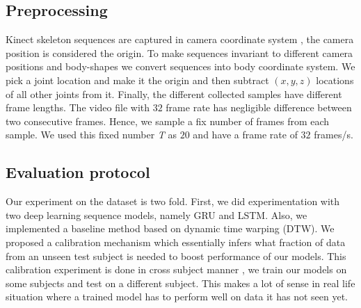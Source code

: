 \documentclass[10pt,twocolumn,letterpaper]{article}
\begin{document}
\subsection{Preprocessing}
Kinect skeleton sequences are 
captured in camera coordinate system \ie, the 
camera position is considered 
the origin. To make sequences invariant to different 
camera positions and body-shapes we convert sequences 
into body coordinate system. We pick a joint location 
and make it the 
origin and then  subtract $(x, y, z)$ locations of all
other joints from it. Finally, the 
different collected samples have
different frame lengths. The video file with $32$ frame rate has negligible difference between two consecutive frames. Hence, we sample 
a fix number of frames from each sample. We used this fixed number \textit{T} as  $20$ and have a frame rate of $32$ frames/s. 



\subsection{Evaluation protocol}
\label{sec:ev_prot}
Our experiment on the dataset is two fold. First, we did experimentation 
with two deep learning sequence models, namely GRU and LSTM. Also, we 
implemented a baseline method based on dynamic time warping (DTW). We proposed a calibration mechanism which essentially infers what fraction of data from an unseen test subject is needed to boost performance of our models. This calibration experiment is done in cross subject manner \eg, we train our models on some subjects and test on a different subject. This makes a lot of sense in real life situation where a trained model has to perform well on data it has not seen yet. 


\end{document}
